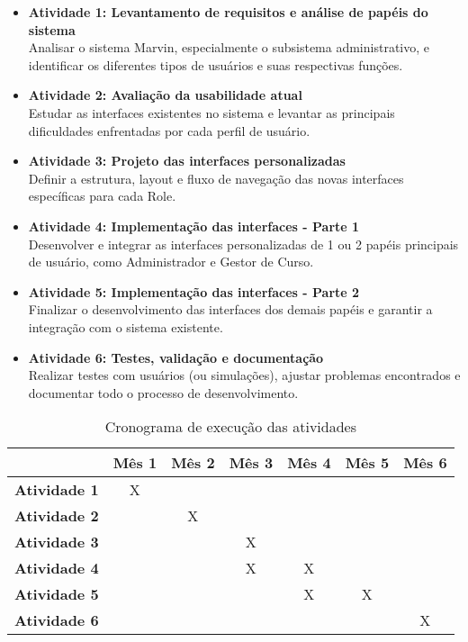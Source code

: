 \begin{itemize}
	\item \textbf{Atividade 1: Levantamento de requisitos e análise de papéis do sistema} \\
	Analisar o sistema Marvin, especialmente o subsistema administrativo, e identificar os diferentes tipos de usuários e suas respectivas funções.
	
	\item \textbf{Atividade 2: Avaliação da usabilidade atual} \\
	Estudar as interfaces existentes no sistema e levantar as principais dificuldades enfrentadas por cada perfil de usuário.
	
	\item \textbf{Atividade 3: Projeto das interfaces personalizadas} \\
	Definir a estrutura, layout e fluxo de navegação das novas interfaces específicas para cada Role.
	
	\item \textbf{Atividade 4: Implementação das interfaces - Parte 1} \\
	Desenvolver e integrar as interfaces personalizadas de 1 ou 2 papéis principais de usuário, como Administrador e Gestor de Curso.
	
	\item \textbf{Atividade 5: Implementação das interfaces - Parte 2} \\
	Finalizar o desenvolvimento das interfaces dos demais papéis e garantir a integração com o sistema existente.
	
	\item \textbf{Atividade 6: Testes, validação e documentação} \\
	Realizar testes com usuários (ou simulações), ajustar problemas encontrados e documentar todo o processo de desenvolvimento.
\end{itemize}

\begin{table}[h]
	\centering
	\caption{Cronograma de execução das atividades}
	\begin{tabular}{l|c|c|c|c|c|c|}
		\cline{2-7}
		\multicolumn{1}{c|}{} & \textbf{Mês 1} & \textbf{Mês 2} & \textbf{Mês 3} & \textbf{Mês 4} & \textbf{Mês 5} & \textbf{Mês 6} \\ \hline
		\multicolumn{1}{|l|}{\textbf{Atividade 1}} & X &   &   &   &   &   \\ \hline
		\multicolumn{1}{|l|}{\textbf{Atividade 2}} &   & X &   &   &   &   \\ \hline
		\multicolumn{1}{|l|}{\textbf{Atividade 3}} &   &   & X &   &   &   \\ \hline
		\multicolumn{1}{|l|}{\textbf{Atividade 4}} &   &   & X & X &   &   \\ \hline
		\multicolumn{1}{|l|}{\textbf{Atividade 5}} &   &   &   & X & X &   \\ \hline
		\multicolumn{1}{|l|}{\textbf{Atividade 6}} &   &   &   &   &   & X \\ \hline
	\end{tabular}
\end{table}